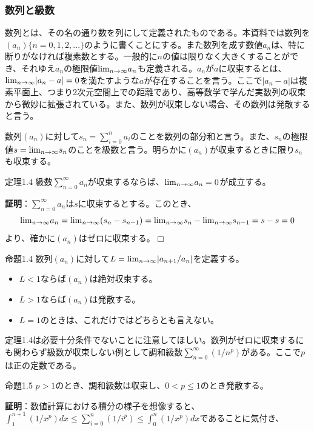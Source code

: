 \documentclass[dvipdfmx, 9pt, a4paper]{jsarticle}
\def\qed{\hfill $\Box$}
\begin{document}
\subsubsection{数列と級数}
数列とは、その名の通り数を列にして定義されたものである。本資料では数列を$(a_n)\{n=0,1,2,...\}$のように書くことにする。また数列を成す数値$a_n$は、特に断りがなければ複素数とする。一般的に$n$の値は限りなく大きくすることができ、それゆえ$a_n$の極限値${\rm lim}_{n\to \infty}a_n$も定義される。$a_n$が$a$に収束するとは、${\rm lim}_{n \to \infty}|a_n-a|=0$を満たすような$a$が存在することを言う。ここで$|a_n-a|$は複素平面上、つまり2次元空間上での距離であり、高等数学で学んだ実数列の収束から微妙に拡張されている。また、数列が収束しない場合、その数列は発散すると言う。\par
数列$(a_n)$に対して$s_n=\sum_{i=0}^na_i$のことを数列の部分和と言う。また、$s_n$の極限値$s={\rm lim}_{n \to \infty}s_n$のことを級数と言う。明らかに$(a_n)$が収束するときに限り$s_n$も収束する。
\begin{itembox}[l]{定理1.4}
級数$\sum_{n=0}^\infty a_n$が収束するならば、${\rm lim}_{n \to \infty}a_n=0$が成立する。
\end{itembox}
{\bf 証明}：$\sum_{n=0}^\infty a_n$は$s$に収束するとする。このとき、
\begin{equation}
{\rm lim}_{n \to \infty}a_n={\rm lim}_{n \to \infty}(s_n-s_{n-1})={\rm lim}_{n \to \infty} s_n - {\rm lim}_{n \to \infty} s_{n-1}=s-s=0 \notag
\end{equation}
より、確かに$(a_n)$はゼロに収束する。\qed
\begin{itembox}[l]{命題1.4}
数列$(a_n)$に対して$L={\rm lim}_{n \to \infty}|a_{n+1}/a_n|$を定義する。
\begin{itemize}
\item $L<1$ならば$(a_n)$は絶対収束する。
\item $L>1$ならば$(a_n)$は発散する。
\item $L=1$のときは、これだけではどちらとも言えない。
\end{itemize}
\end{itembox}
定理1.4は必要十分条件でないことに注意してほしい。数列がゼロに収束するにも関わらず級数が収束しない例として調和級数$\sum_{n=0}^\infty (1/n^p)$がある。ここで$p$は正の定数である。
\begin{itembox}[l]{命題1.5}
$p>1$のとき、調和級数は収束し、$0<p \leq 1$のとき発散する。
\end{itembox}
{\bf 証明}：数値計算における積分の様子を想像すると、$\int_1^{n+1}(1/x^p)dx \leq \sum_{i=0}^n(1/i^p) \leq \int_0^n(1/x^p)dx$であることに気付き、
\end{document}
